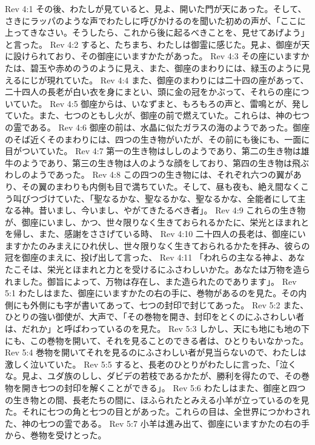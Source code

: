Rev 4:1  その後、わたしが見ていると、見よ、開いた門が天にあった。そして、さきにラッパのような声でわたしに呼びかけるのを聞いた初めの声が、「ここに上ってきなさい。そうしたら、これから後に起るべきことを、見せてあげよう」と言った。
Rev 4:2  すると、たちまち、わたしは御霊に感じた。見よ、御座が天に設けられており、その御座にいますかたがあった。
Rev 4:3  その座にいますかたは、碧玉や赤めのうのように見え、また、御座のまわりには、緑玉のように見えるにじが現れていた。
Rev 4:4  また、御座のまわりには二十四の座があって、二十四人の長老が白い衣を身にまとい、頭に金の冠をかぶって、それらの座についていた。
Rev 4:5  御座からは、いなずまと、もろもろの声と、雷鳴とが、発していた。また、七つのともし火が、御座の前で燃えていた。これらは、神の七つの霊である。
Rev 4:6  御座の前は、水晶に似たガラスの海のようであった。御座のそば近くそのまわりには、四つの生き物がいたが、その前にも後にも、一面に目がついていた。
Rev 4:7  第一の生き物はししのようであり、第二の生き物は雄牛のようであり、第三の生き物は人のような顔をしており、第四の生き物は飛ぶわしのようであった。
Rev 4:8  この四つの生き物には、それぞれ六つの翼があり、その翼のまわりも内側も目で満ちていた。そして、昼も夜も、絶え間なくこう叫びつづけていた、「聖なるかな、聖なるかな、聖なるかな、全能者にして主なる神。昔いまし、今いまし、やがてきたるべき者」。
Rev 4:9  これらの生き物が、御座にいまし、かつ、世々限りなく生きておられるかたに、栄光とほまれとを帰し、また、感謝をささげている時、
Rev 4:10  二十四人の長老は、御座にいますかたのみまえにひれ伏し、世々限りなく生きておられるかたを拝み、彼らの冠を御座のまえに、投げ出して言った、
Rev 4:11  「われらの主なる神よ、あなたこそは、栄光とほまれと力とを受けるにふさわしいかた。あなたは万物を造られました。御旨によって、万物は存在し、また造られたのであります」。
Rev 5:1  わたしはまた、御座にいますかたの右の手に、巻物があるのを見た。その内側にも外側にも字が書いてあって、七つの封印で封じてあった。
Rev 5:2  また、ひとりの強い御使が、大声で、「その巻物を開き、封印をとくのにふさわしい者は、だれか」と呼ばわっているのを見た。
Rev 5:3  しかし、天にも地にも地の下にも、この巻物を開いて、それを見ることのできる者は、ひとりもいなかった。
Rev 5:4  巻物を開いてそれを見るのにふさわしい者が見当らないので、わたしは激しく泣いていた。
Rev 5:5  すると、長老のひとりがわたしに言った、「泣くな。見よ、ユダ族のしし、ダビデの若枝であるかたが、勝利を得たので、その巻物を開き七つの封印を解くことができる」。
Rev 5:6  わたしはまた、御座と四つの生き物との間、長老たちの間に、ほふられたとみえる小羊が立っているのを見た。それに七つの角と七つの目とがあった。これらの目は、全世界につかわされた、神の七つの霊である。
Rev 5:7  小羊は進み出て、御座にいますかたの右の手から、巻物を受けとった。
